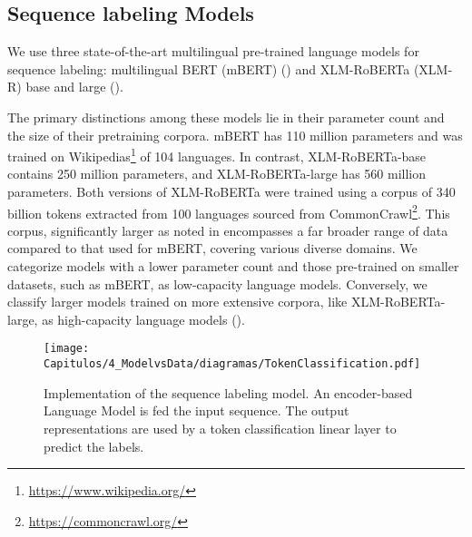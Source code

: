 \subsection{Sequence labeling Models}

We use three state-of-the-art multilingual pre-trained language models for sequence labeling: multilingual BERT (mBERT) (\cite{devlin-etal-2019-bert})
and XLM-RoBERTa (XLM-R) base and large (\cite{conneau-etal-2020-unsupervised}). 

The primary distinctions among these models lie in their parameter count and the size of their pretraining corpora. mBERT has 110 million parameters and was trained on Wikipedias\footnote{\url{https://www.wikipedia.org/}} of 104 languages. In contrast, XLM-RoBERTa-base contains 250 million parameters, and XLM-RoBERTa-large has 560 million parameters. Both versions of XLM-RoBERTa were trained using a corpus of 340 billion tokens extracted from 100 languages sourced from CommonCrawl\footnote{\url{https://commoncrawl.org/}}. This corpus, significantly larger as noted in \citet{conneau-etal-2020-unsupervised} encompasses a far broader range of data compared to that used for mBERT, covering various diverse domains. We categorize models with a lower parameter count and those pre-trained on smaller datasets, such as mBERT, as low-capacity language models. Conversely, we classify larger models trained on more extensive corpora, like XLM-RoBERTa-large, as high-capacity language models (\cite{aharoni-etal-2019-massively}). 


\begin{figure}
    \centering
    \texttt{[image: Capitulos/4\_ModelvsData/diagramas/TokenClassification.pdf]}
    \caption{Implementation of the sequence labeling model. An encoder-based Language Model is fed the input sequence. The output representations are used by a token classification linear layer to predict the labels.}
    \label{fig:chapter4_tokenclassification}
\end{figure}

